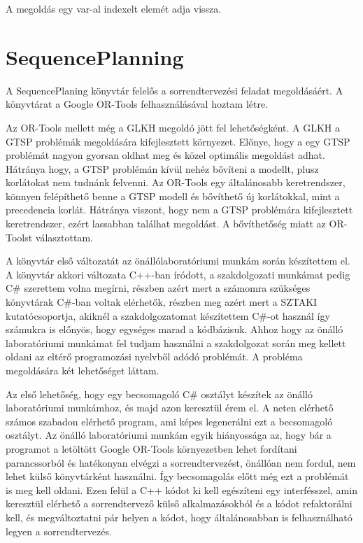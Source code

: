 A megoldás egy var-al indexelt elemét adja vissza.

\section{SequencePlanning}

A SequencePlaning könyvtár felelős a sorrendtervezési feladat megoldásáért. 
A könyvtárat a Google OR-Tools felhasználásával hoztam létre.

Az OR-Tools mellett még a GLKH  \cite{Helsgaun:2015} megoldó jött fel lehetőségként. A GLKH a GTSP problémák megoldására kifejlesztett környezet. Előnye, hogy a egy GTSP problémát nagyon gyorsan oldhat meg és közel optimális megoldást adhat. Hátránya hogy, a GTSP problémán kívül nehéz bővíteni a modellt, plusz korlátokat nem tudnánk felvenni. Az OR-Tools egy általánosabb keretrendszer, könnyen felépíthető benne a GTSP modell és bővíthető új korlátokkal, mint a precedencia korlát. Hátránya viszont, hogy nem a GTSP problémára kifejlesztett keretrendszer, ezért lassabban találhat megoldást. A bővíthetőség miatt az OR-Toolst választottam.

A könyvtár első változatát az önállólaboratóriumi munkám során készítettem el. A könyvtár akkori változata C++-ban íródott, a szakdolgozati munkámat pedig C\# szerettem volna megírni, részben azért mert a számomra szükséges könyvtárak C\#-ban voltak elérhetők, részben meg azért mert a SZTAKI kutatócsoportja, akiknél a szakdolgozatomat készítettem C\#-ot használ így számukra is előnyös, hogy egységes marad a kódbázisuk. Ahhoz hogy az önálló laboratóriumi munkámat fel tudjam használni a szakdolgozat során meg kellett oldani az eltérő programozási nyelvből adódó problémát. A probléma megoldására két lehetőséget láttam.

Az első lehetőség, hogy egy becsomagoló C\# osztályt készítek az önálló laboratóriumi munkámhoz, és majd azon keresztül érem el. A neten elérhető számos szabadon elérhető program, ami képes legenerálni ezt a becsomagoló osztályt. 
Az önálló laboratóriumi munkám egyik hiányossága az, hogy bár a programot a letöltött Google OR-Tools környezetben lehet fordítani parancssorból és hatékonyan elvégzi a sorrendtervezést, önállóan nem fordul, nem lehet külső könyvtárként használni. Így becsomagolás előtt még ezt a problémát is meg kell oldani. 
Ezen felül a C++ kódot ki kell egészíteni egy interfésszel, amin keresztül elérhető a sorrendtervező külső alkalmazásokból és a kódot refaktorálni kell, és megváltoztatni pár helyen a kódot, hogy általánosabban is felhasználható legyen a sorrendtervezés. 

